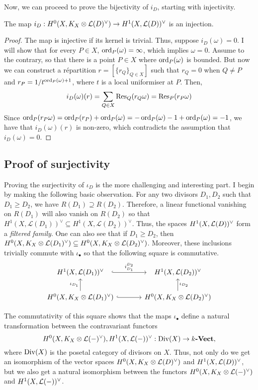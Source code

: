 Now, we can proceed to prove the bijectivity of $i_{D}$, starting with
injectivity.
\begin{prop}\label{prop:injectivity}
  The map $i_{D}:H^0(X,K_X\otimes\mathcal{L}(D)^{\vee})\to H^1(X,\mathcal{L}(D))^{\vee}$ is an injection.
\end{prop}
\begin{proof}
  The map is injective if its kernel is trivial. Thus, suppose
  $i_{D}(\omega)=0$. I will show that for every $P\in X$,
  $\operatorname{ord}_{P}(\omega)=\infty$, which implies $\omega=0$.
  Assume to the contrary, so that there is a point $P\in X$ where
  $\operatorname{ord}_{P}(\omega)$ is bounded. But now we can construct a r\'epartition
  $r=[\{r_{Q}\}_{Q\in X}]$ such that $r_{Q}=0$ when $Q\neq P$ and
  $r_{P}=1/t^{\operatorname{ord}_{P}(\omega)+1}$, where $t$ is a local uniformiser at $P$.
  Then,
  \[
    i_{D}(\omega)(r)=\sum_{Q\in X}\operatorname{Res}_{Q}(r_{Q}\omega)=\operatorname{Res}_{P}(r_{P}\omega)
  \]
  Since $\operatorname{ord}_{P}(r_{P}\omega)=\operatorname{ord}_{P}(r_{P})+\operatorname{ord}_{P}(\omega)
  =-\operatorname{ord}_{P}(\omega)-1+\operatorname{ord}_{P}(\omega)=-1$, we have that $i_{D}(\omega)(r)$ is
  non-zero, which contradicts the assumption that $i_{D}(\omega)=0$.
\end{proof}

\subsection{Proof of surjectivity}
Proving the surjectivity of $\iota_{D}$ is the more challenging and
interesting part. I begin by making the following basic observation.
For any two divisors $D_{1}, D_{2}$ such that $D_{1}\geq D_{2}$, we have
$R(D_{1})\supseteq R(D_{2})$. Therefore, a linear functional vanishing on
$R(D_{1})$ will also vanish on $R(D_{2})$ so that
$H^{1}(X,\mathcal{L}(D_{1}))^{\vee}\subseteq H^{1}(X,\mathcal{L}(D_{2}))^\vee$.
Thus, the spaces $H^1(X,\mathcal{L}(D))^{\vee}$ form a \emph{filtered
  family}. One can also see that if $D_{1}\geq D_{2}$, then
$H^0(X,K_X\otimes\mathcal{L}(D_{1})^{\vee})\subseteq H^0(X,K_X\otimes\mathcal{L}(D_{2})^{\vee})$. Moreover, these inclusions trivially
commute with $\iota_{\bullet}$ so that the following square is commutative.
\begin{equation}\label{eq:iota_square}
  \begin{tikzcd}[column sep=large]
    \dual{D_{1}}\rar[hook, shorten=.7em, "i_{D_{1}}^{D_{2}}"] & \dual{D_{2}} \\
    \diffs{D_{1}}\uar{\iota_{D_{1}}}\rar[hook]
    & \diffs{D_{2}}\uar["\iota_{D_{2}}"']
  \end{tikzcd}
\end{equation}
\begin{cat}
  The commutativity of this square shows that the maps $\iota_{\bullet}$
  define a natural transformation between the contravariant functors
  \[
    H^0(X,K_X\otimes\mathcal{L}(-)^{\vee}),H^1(X,\mathcal{L}(-))^{\vee}:\operatorname{Div}(X)\to k\textbf{-Vect},
  \]
  where $\operatorname{Div}(X)$ is the posetal category of divisors on $X$.
  Thus, not only do we get an isomorphism of the vector spaces
  $H^0(X,K_X\otimes\mathcal{L}(D)^{\vee})$ and $H^1(X,\mathcal{L}(D))^{\vee}$, but we also get a natural isomorphism
  between the functors $H^0(X,K_X\otimes\mathcal{L}(-)^{\vee})$ and $H^1(X,\mathcal{L}(-))^{\vee}$.
\end{cat}


